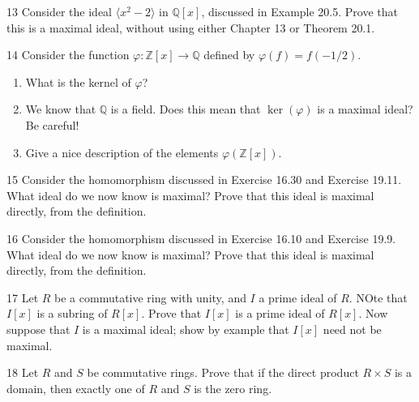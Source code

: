 \begin{problem}{13}
    Consider the ideal $\langle x^2 - 2 \rangle$ in $\mathbb{Q}[x]$, discussed in
    Example 20.5. Prove that this is a maximal ideal, without using either Chapter 13 or
    Theorem 20.1.
\end{problem}
\unsolved

\begin{problem}{14}
    Consider the function $\varphi : \mathbb{Z}[x] \to \mathbb{Q}$ defined by
    $\varphi(f) = f(-1/2)$.
    \begin{enumerate}
        \item[(a)] What is the kernel of $\varphi$?
        \item[(b)] We know that $\mathbb{Q}$ is a field. Does this mean that
        $\ker(\varphi)$ is a maximal ideal? Be careful!
        \item[(c)] Give a nice description of the elements $\varphi(\mathbb{Z}[x])$.
    \end{enumerate}
\end{problem}
\unsolved

\begin{problem}{15}
    Consider the homomorphism discussed in Exercise 16.30 and Exercise 19.11. What ideal
    do we now know is maximal? Prove that this ideal is maximal directly, from the
    definition.
\end{problem}
\unsolved

\begin{problem}{16}
    Consider the homomorphism discussed in Exercise 16.10 and Exercise 19.9. What ideal
    do we now know is maximal? Prove that this ideal is maximal directly, from the
    definition.
\end{problem}
\unsolved

\begin{problem}{17}
    Let $R$ be a commutative ring with unity, and $I$ a prime ideal of $R$.
    NOte that $I[x]$ is a subring of $R[x]$. Prove that $I[x]$ is a prime ideal of $R[x]$.
    Now suppose that $I$ is a maximal ideal; show by example that $I[x]$ need not be maximal.
\end{problem}
\unsolved

\begin{problem}{18}
    Let $R$ and $S$ be commutative rings. Prove that if the direct product $R \times S$ is
    a domain, then exactly one of $R$ and $S$ is the zero ring.
\end{problem}
\unsolved

